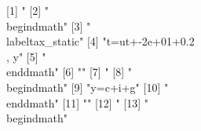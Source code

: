  [1] "%
 [2] "\\begin{dmath}"                                                                                                                                                                    
 [3] "\\label{tax_static}"                                                                                                                                                               
 [4] "{t}={ut}+-2e+01+0.2\\, {y}"                                                                                                                                                        
 [5] "\\end{dmath}"                                                                                                                                                                      
 [6] ""                                                                                                                                                                                  
 [7] "%
 [8] "\\begin{dmath}"                                                                                                                                                                    
 [9] "{y}={c}+{i}+{g}"                                                                                                                                                                   
[10] "\\end{dmath}"                                                                                                                                                                      
[11] ""                                                                                                                                                                                  
[12] "%
[13] "\\begin{dmath}"                                                                                                                                                                    
